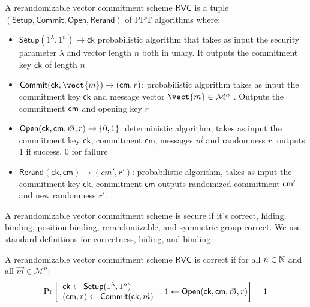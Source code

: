 \begin{definition} 
    A rerandomizable vector commitment scheme $\mathsf{RVC}$ is a tuple $(\mathsf{Setup}, \mathsf{Commit}, \mathsf{Open}, \mathsf{Rerand})$ of PPT algorithms where:
    
    \begin{itemize}
        \item $\mathsf{Setup}(1^\lambda, 1^n) \to \mathsf{ck}$ probabilistic algorithm that takes as input the security parameter $\lambda$ and vector length $n$ both in unary. It outputs the commitment key $\mathsf{ck}$ of length $n$
        
        \item $\mathsf{Commit}(\mathsf{ck}, \vect{m}) \to (\cm, r)$: probabilistic algorithm takes as input the commitment key $\mathsf{ck}$ and message vector $\vect{m} \in \mathcal{M}^n$ . Outputs the commitment $\mathsf{cm}$ and opening key $r$

        \item $\mathsf{Open}(\mathsf{ck, cm}, \vec{m}, r) \to \{0,1\}$: deterministic algorithm, takes as input the commitment key $\mathsf{ck}$, commitment $\mathsf{cm}$, messages $\vec{m}$ and randomness $r$, outputs 1 if success, 0 for failure

        \item $\mathsf{Rerand}(\mathsf{ck, cm}) \to (cm', r')$: probabilistic algorithm, takes as input the commitment key $\mathsf{ck}$, commitment $\mathsf{cm}$ outputs randomized commitment $\mathsf{cm}'$ and new randomness $r'$. 
        
    \end{itemize}
\end{definition}

\noindent A rerandomizable vector commitment scheme is secure if it's correct, hiding, binding, position binding, rerandomizable, and symmetric group correct. We use standard definitions for correctness, hiding, and binding.


\begin{definition}[Correctness] A rerandomizable vector commitment scheme $\mathsf{RVC}$ is correct if for all $n \in \mathbb{N}$ and all $\vec{m} \in \mathcal{M}^n$:
        \[
        \Pr
            \left [
                \begin{array}{l}
                    \mathsf{ck} \gets \mathsf{Setup}(1^\lambda, 1^n) \\
                    (\mathsf{cm}, r) \gets \mathsf{Commit}(\mathsf{ck}, \vec{m}) \\
                \end{array}
                : 1 \gets \mathsf{Open}(\mathsf{ck}, \mathsf{cm}, \vec{m}, r)
            \right ] = 1
    \]
\end{definition}


